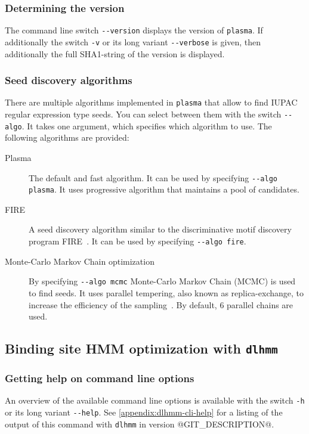 \documentclass[a4paper]{article}
\makeatletter
\newcommand{\plasma}[0]{\texttt{plasma}}
\newcommand{\dlhmm}[0]{\texttt{dlhmm}}
\newcommand{\version}[0]{@GIT_DESCRIPTION@}
\makeatother
\begin{document}
\subsubsection{Determining the version}
The command line switch \verb|--version| displays the version of \plasma{}.
If additionally the switch \verb|-v| or its long variant \verb|--verbose| is given, then additionally the full SHA1-string of the version is displayed.

\subsubsection{Seed discovery algorithms}
There are multiple algorithms implemented in \plasma{} that allow to find IUPAC regular expression type seeds.
You can select between them with the switch \verb|--algo|.
It takes one argument, which specifies which algorithm to use.
The following algorithms are provided:
\begin{description}
  \item[Plasma]
    The default and fast algorithm.
    It can be used by specifying \verb|--algo plasma|.
    It uses progressive algorithm that maintains a pool of candidates.
  \item[FIRE]
    A seed discovery algorithm similar to the discriminative motif discovery program FIRE~\cite{Elemento2007}.
    It can be used by specifying \verb|--algo fire|.
  \item[Monte-Carlo Markov Chain optimization]
    By specifying \verb|--algo mcmc| Monte-Carlo Markov Chain (MCMC) is used to find seeds.
    It uses parallel tempering, also known as replica-exchange, to increase the efficiency of the sampling~\cite{Earl2005}.
    By default, 6 parallel chains are used.
\end{description}

\subsection{Binding site HMM optimization with \dlhmm{}}
\label{subsection:running-dlhmm}
\subsubsection{Getting help on command line options}
An overview of the available command line options is available with the switch \verb|-h| or its long variant \verb|--help|.
See \cref{appendix:dlhmm-cli-help} for a listing of the output of this command with \dlhmm{} in version \version{}.
\end{document}
